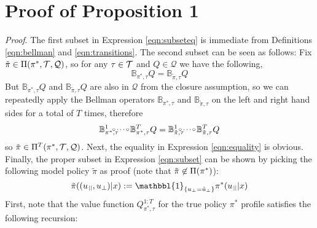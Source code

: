 \section{Proof of Proposition 1}\label{app:a}

\thmequivalence*

\textit{Proof}.
%
The first subset in Expression \ref{eqn:subseteq} is immediate from Definitions \ref{eqn:bellman} and \ref{eqn:transitions}.
%
The second subset can be seen as follows:
%
%
Fix $\tilde{\pi}\in\Pi(\pi^{*},\mathcal{T},\mathcal{Q})$,
so for any $\tau\in\mathcal{T}$
and $Q\in\mathcal{Q}$
we have the following,
%
\begin{equation}
\mathbb{B}_{\pi^{*},\tau}Q
=
\mathbb{B}_{\tilde{\pi},\tau}Q
\end{equation}
%
But $\mathbb{B}_{\pi^{*},\tau}Q$ and $\mathbb{B}_{\tilde{\pi},\tau}Q$ are also in $\mathcal{Q}$ from the closure assumption, so we can repeatedly apply the Bellman operators $\mathbb{B}_{\pi^{*},\tau}$ and $\mathbb{B}_{\tilde{\pi},\tau}$ on the left and right hand sides for a total of $T$ times, therefore
%
\begin{equation}
\mathbb{B}_{\pi^{*},\tau}^{1}
\hspace{-8pt}\raisebox{1pt}{\scalebox{0.8}{$\circ\dots\circ$}}\hspace{1pt}
\mathbb{B}_{\pi^{*},\tau}^{T}Q
=
\mathbb{B}_{\tilde{\pi},\tau}^{1}
\hspace{-7pt}\raisebox{1pt}{\scalebox{0.8}{$\circ\dots\circ$}}\hspace{1pt}
\mathbb{B}_{\tilde{\pi},\tau}^{T}Q
\end{equation}
%
so $\tilde{\pi}\in\Pi^{T}(\pi^{*},\mathcal{T},\mathcal{Q})$.
%
Next, the equality in Expression \ref{eqn:equality} is obvious.
%
%
Finally, 
%
%
the proper subset in Expression \ref{eqn:subset} can be shown by picking the following model policy $\tilde{\pi}$ as proof (note that $\tilde{\pi}\not\in\Pi(\pi^{*})$):
%
\begin{equation}
\tilde{\pi}((u_{\para},u_{\bot})|x)
:=
\mathbbl{1}_{\{u_{\bot}=\tilde{u}_{\bot}\}}
\pi^{*}(u_{\para}|x)
\end{equation}
%
First, note that the value function $Q_{\pi^{*},\tau}^{1:T}$ for the true policy $\pi^{*}$ profile satisfies the following recursion:
